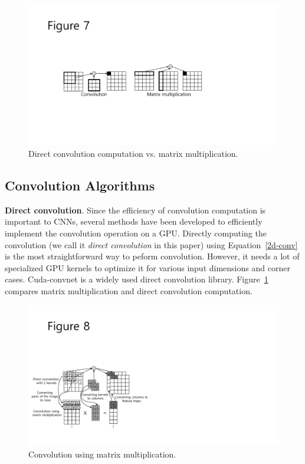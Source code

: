 \begin{figure}[htbp]
  \centering
  \includegraphics[width=0.5\linewidth]{./figures/direct}
  \caption{Direct convolution computation vs. matrix multiplication.}
  \label{fig_direct}
\end{figure}

\subsection{Convolution Algorithms}
\label{sec:algorithms}
{\bf Direct convolution}. Since the efficiency of convolution computation is important to CNNs, several methods have been developed to efficiently implement the convolution operation on a GPU. Directly computing the convolution (we call it \textit{direct convolution} in this paper) using Equation~\ref{2d-conv} is the most straightforward way to peform convolution. However, it needs a lot of specialized GPU kernels to optimize it for various input dimensions and corner cases. Cuda-convnet\cite{cuda-convnet} is a widely used direct convolution library. Figure~\ref{fig_direct} compares matrix multiplication and direct convolution computation.

\begin{figure}[htbp]
  \centering
  \includegraphics[width=\linewidth]{./figures/matmul}
  \caption{Convolution using matrix multiplication.}
  \label{fig_matmul}
\end{figure}

